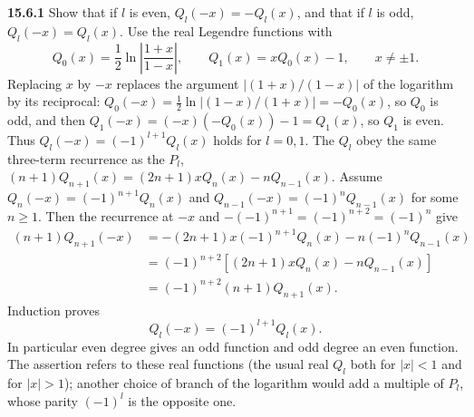 \par\bigskip
\noindent\textbf{15.6.1}\quad {}
Show that if $l$ is even,
$Q_{l}(-x)=-Q_{l}(x)$, and that if $l$ is odd, $Q_{l}(-x)=Q_{l}(x)$.
\solution
Use the real Legendre functions with
\[
Q_0(x)=\frac12\ln\left|\frac{1+x}{1-x}\right|,\qquad
Q_1(x)=xQ_0(x)-1,\qquad x\ne\pm1.
\]
Replacing $x$ by $-x$ replaces the argument $|(1+x)/(1-x)|$ of the
logarithm by its reciprocal:
$Q_0(-x)=\frac12\ln|(1-x)/(1+x)|=-Q_0(x)$, so $Q_0$ is odd, and then
$Q_1(-x)=(-x)(-Q_0(x))-1=Q_1(x)$, so $Q_1$ is even. Thus
$Q_l(-x)=(-1)^{l+1}Q_l(x)$ holds for $l=0,1$.
The $Q_l$ obey the same three-term recurrence as the $P_l$,
$(n+1)Q_{n+1}(x)=(2n+1)xQ_n(x)-nQ_{n-1}(x)$.
Assume $Q_n(-x)=(-1)^{n+1}Q_n(x)$ and
$Q_{n-1}(-x)=(-1)^nQ_{n-1}(x)$ for some $n\ge1$. Then the
recurrence at $-x$ and $-(-1)^{n+1}=(-1)^{n+2}=(-1)^n$ give
\begin{align*}
(n+1)Q_{n+1}(-x)
&=-(2n+1)x(-1)^{n+1}Q_n(x)-n(-1)^nQ_{n-1}(x)\\
&=(-1)^{n+2}[(2n+1)xQ_n(x)-nQ_{n-1}(x)]\\
&=(-1)^{n+2}(n+1)Q_{n+1}(x).
\end{align*}
Induction proves
\[
\boxed{Q_l(-x)=(-1)^{l+1}Q_l(x)}.
\]
In particular even degree gives an odd function and odd degree an
even function. The assertion refers to these real functions (the
usual real $Q_l$ both for $|x|<1$ and for $|x|>1$); another choice of
branch of the logarithm would add a multiple of $P_l$, whose parity
$(-1)^l$ is the opposite one.


